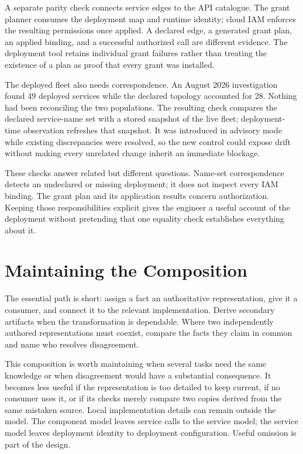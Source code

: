 A separate parity check connects service edges to the API catalogue. The grant planner consumes the deployment map and runtime identity; cloud IAM enforces the resulting permissions once applied. A declared edge, a generated grant plan, an applied binding, and a successful authorized call are different evidence. The deployment tool retains individual grant failures rather than treating the existence of a plan as proof that every grant was installed.

The deployed fleet also needs correspondence. An August 2026 investigation found 49 deployed services while the declared topology accounted for 28. Nothing had been reconciling the two populations. The resulting check compares the declared service-name set with a stored snapshot of the live fleet; deployment-time observation refreshes that snapshot. It was introduced in advisory mode while existing discrepancies were resolved, so the new control could expose drift without making every unrelated change inherit an immediate blockage.

These checks answer related but different questions. Name-set correspondence detects an undeclared or missing deployment; it does not inspect every IAM binding. The grant plan and its application results concern authorization. Keeping those responsibilities explicit gives the engineer a useful account of the deployment without pretending that one equality check establishes everything about it.

\section{Maintaining the Composition}\label{heading:handbook-maintaining-coherence}

The essential path is short: assign a fact an authoritative representation, give it a consumer, and connect it to the relevant implementation. Derive secondary artifacts when the transformation is dependable. Where two independently authored representations must coexist, compare the facts they claim in common and name who resolves disagreement.

This composition is worth maintaining when several tasks need the same knowledge or when disagreement would have a substantial consequence. It becomes less useful if the representation is too detailed to keep current, if no consumer uses it, or if its checks merely compare two copies derived from the same mistaken source. Local implementation details can remain outside the model. The component model leaves service calls to the service model; the service model leaves deployment identity to deployment configuration. Useful omission is part of the design.
